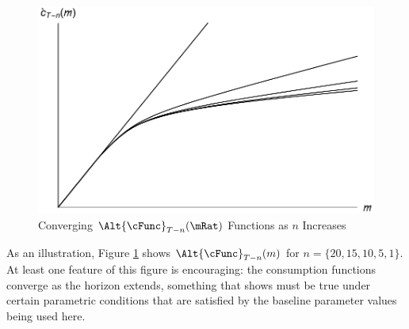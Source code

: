 \documentclass[titlepage]{\econtex}
\begin{document}
\hypertarget{PlotCFuncsConverge}{}
\begin{figure}
        \includegraphics{./Figures/PlotCFuncsConverge}
        \caption{Converging $\Alt{\cFunc}_{T-n}({\mRat})$ Functions as $n$ Increases}
        \label{fig:PlotCFuncsConverge}
\end{figure}


As an illustration, Figure \ref{fig:PlotCFuncsConverge} shows
$\Alt{\cFunc}_{T-n}({m})$ for $n=\{20,15,10,5,1\}$.  At least one
feature of this figure is encouraging: the consumption functions
converge as the horizon extends, something that \cite{BufferStockTheory}
shows must be true under certain parametric conditions that are
satisfied by the baseline parameter values being used here.
\end{document}

